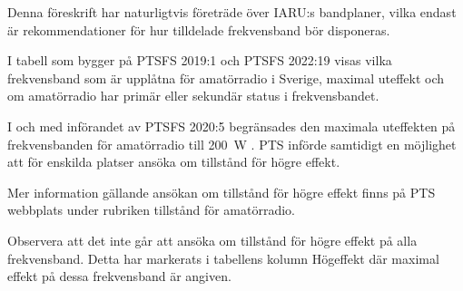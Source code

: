 Denna föreskrift har naturligtvis företräde över IARU:s bandplaner, vilka
endast är rekommendationer för hur tilldelade frekvensband bör disponeras.

I tabell  som bygger på PTSFS 2019:1 och PTSFS 2022:19 visas
vilka frekvensband som är upplåtna för amatörradio i Sverige, maximal uteffekt
och om amatörradio har primär eller sekundär status i frekvensbandet.

I och med införandet av PTSFS 2020:5 begränsades den maximala uteffekten på
frekvensbanden för amatörradio till \qty{200}{\watt} \pep.
PTS införde samtidigt en möjlighet att för enskilda platser ansöka om tillstånd
för högre effekt.

Mer information gällande ansökan om tillstånd för högre effekt finns på PTS
webbplats under rubriken tillstånd för amatörradio.

Observera att det inte går att ansöka om tillstånd för högre effekt på alla
frekvensband. Detta har markerats i tabellens kolumn Högeffekt där maximal
effekt på dessa frekvensband är angiven.

